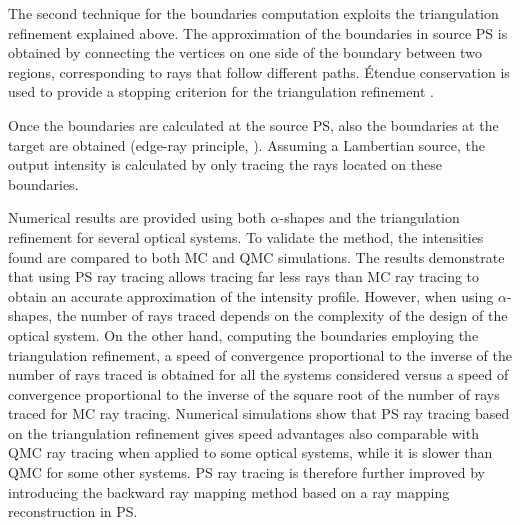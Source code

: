 The second technique for the boundaries computation exploits the triangulation refinement explained above. The approximation of the boundaries in source PS is obtained by connecting the vertices on one side of the boundary between two regions, corresponding to rays that follow different paths.
\'{E}tendue conservation is used to provide a stopping criterion for the triangulation refinement \cite{filosa2016ray, filosa2017phase}.  

Once the boundaries are calculated at the source PS, also the boundaries at the target are obtained (edge-ray principle, \cite{Ries:2}). Assuming a Lambertian source, the output intensity is calculated by only tracing the rays located on these boundaries. 

Numerical results are provided using both $\alpha$-shapes and the triangulation refinement for several optical systems.
To validate the method, the intensities found are compared to both MC and QMC simulations. The results demonstrate that using PS ray tracing allows tracing far less rays than MC ray tracing to obtain an accurate approximation of the intensity profile. However, when using $\alpha$-shapes, the number of rays traced depends on the complexity of the design of the optical system. On the other hand, computing the boundaries employing the triangulation refinement, a speed of convergence proportional to the inverse of the number of rays traced is obtained for all the systems considered versus a speed of convergence proportional to the inverse of the square root of the number of rays traced for MC ray tracing. Numerical simulations show that PS ray tracing based on the triangulation refinement gives speed advantages also comparable with QMC ray tracing when applied to some optical systems, while it is slower than QMC for some other systems.
PS ray tracing is therefore further improved by introducing the backward ray mapping method based on a ray mapping reconstruction in PS. 


